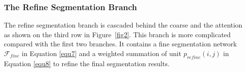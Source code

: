 \documentclass[10.5pt,compsoc]{TsT}
\theoremstyle{mystyle}
\begin{document}
{%


\subsubsection{The Refine Segmentation Branch}
\label{s:rsb}
\noindent

The refine segmentation branch is cascaded behind the coarse and the attention as shown on the third row in Figure~\ref{fig2}. This branch is more complicated compared with the first two branches. It contains a fine segmentation network $\mathcal{F}_{fine}$ in Equation \ref{equ7} and a weighted summation of unit $p_{refine}(i,j)$ in Equation \ref{equ8} to refine the final segmentation results.

}
\end{document}
